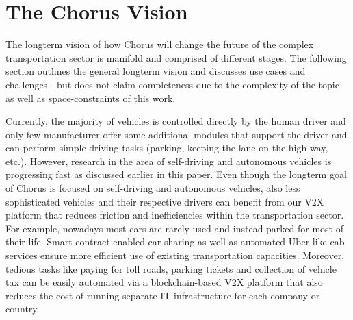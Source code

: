 \documentclass{llncs}
\begin{document}
{		%
		


	\section{The Chorus Vision}
		\label{s:section-3}
		
		
		The longterm vision of how Chorus will change the future of the complex transportation sector is manifold and comprised of different stages. The following section outlines the general longterm vision and discusses use cases and challenges - but does not claim completeness due to the complexity of the topic as well as space-constraints of this work. 
		
		Currently, the majority of vehicles is controlled directly by the human driver and only few manufacturer offer some additional modules that support the driver and can perform simple driving tasks (parking, keeping the lane on the high-way, etc.). However, research in the area of self-driving and autonomous vehicles is progressing fast as discussed earlier in this paper. Even though the longterm goal of Chorus is focused on self-driving and autonomous vehicles, also less sophisticated vehicles and their respective drivers can benefit from our V2X platform that reduces friction and inefficiencies within the transportation sector. For example, nowadays most cars are rarely used and instead parked for most of their life. Smart contract-enabled car sharing as well as automated Uber-like cab services ensure more efficient use of existing transportation capacities. Moreover, tedious tasks like paying for toll roads, parking tickets and collection of vehicle tax can be easily automated via a blockchain-based V2X platform that also reduces the cost of running separate IT infrastructure for each company or country.
		
}
\end{document}
